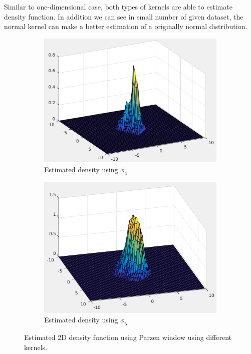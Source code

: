 \documentclass[12pt]{article}
\begin{document}
\begin{itemize}
Similar to one-dimensional case, both types of kernels are able to estimate density function. In addition we can see in small number of given dataset, the normal kernel can make a better estimation of a originally normal distribution.
\begin{figure}[h]
\centering
\begin{subfigure}{0.45\textwidth}
\centering
\includegraphics[scale=0.35]{Imgs/5-9.png}
\caption{Estimated density using $\phi_4$}
\end{subfigure}
\begin{subfigure}{0.45\textwidth}
\centering
\includegraphics[scale=0.35]{Imgs/5-10.png}
\caption{Estimated density using $\phi_5$}
\end{subfigure}
\caption{Estimated 2D density function using Parzen window using different kernels.}
\label{fig:5-3}
\end{figure}


\end{itemize}
\end{document}
